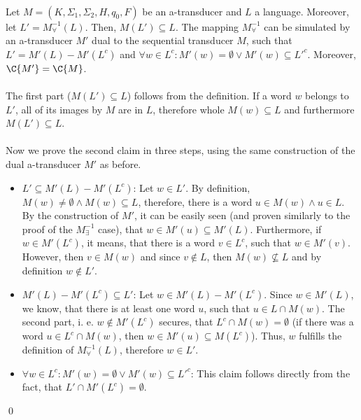 \paragraph{}
\clema Let $M = (K, \Sigma_1, \Sigma_2, H, q_0, F)$ be an a-transducer and $L$ a language. Moreover, let $L' = M_{\forall}^{-1}(L)$. Then, $M(L') \subseteq L$. The mapping $M_{\forall}^{-1}$ can be simulated by an a-transducer $M'$ dual to the sequential transducer $M$, such that $L' = M'(L) - M'(L^c)$ and $\forall w \in L^c: M'(w) = \emptyset \vee M'(w) \subseteq L'^c$. Moreover, $\C{M'} = \C{M}$.

\paragraph{}
\dokaz The first part ($M(L') \subseteq L$) follows from the definition. If a word $w$ belongs to $L'$, all of its images by $M$ are in $L$, therefore whole $M(w) \subseteq L$ and furthermore $M(L') \subseteq L$.

\paragraph{}
Now we prove the second claim in three steps, using the same construction of the dual a-transducer $M'$ as before.
\begin{itemize}
\item $L' \subseteq M'(L) - M'(L^c)$: Let $w \in L'$. By definition, $M(w) \neq \emptyset \wedge M(w) \subseteq L$, therefore, there is a word $u \in M(w) \wedge u \in L$. By the construction of $M'$, it can be easily seen (and proven similarly to the proof of the $M_{\exists}^{-1}$ case), that $w \in M'(u) \subseteq M'(L)$. Furthermore, if $w \in M'(L^c)$, it means, that there is a word $v \in L^c$, such that $w \in M'(v)$. However, then $v \in M(w)$ and since $v \notin L$, then $M(w) \not \subseteq L$ and by definition $w \notin L'$.

\item $M'(L) - M'(L^c) \subseteq L'$: Let $w \in M'(L) - M'(L^c)$. Since $w \in M'(L)$, we know, that there is at least one word $u$, such that $u \in L \cap M(w)$. The second part, i. e. $w \notin M'(L^c)$ secures, that $L^c \cap M(w) = \emptyset$ (if there was a word $u \in L^c \cap M(w)$, then $w \in M'(u) \subseteq M(L^c)$). Thus, $w$ fulfills the definition of $M^{-1}_{\forall}(L)$, therefore $w \in L'$.

\item $\forall w \in L^c: M'(w) = \emptyset \vee M'(w) \subseteq L'^c$: This claim follows directly from the fact, that $L' \cap M'(L^c) = \emptyset$.
\end{itemize} \qed

